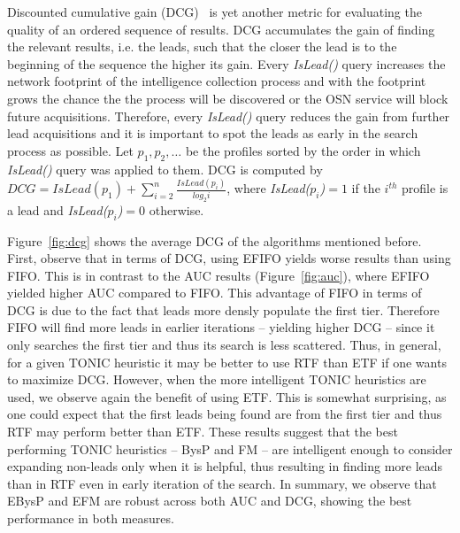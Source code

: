 \documentclass[prodmode,acmtecs]{acmsmall} %
\newcommand{\islead}[1]{{\em IsLead(#1)}}
\begin{document}
 

Discounted cumulative gain (DCG)~\cite{dcg} is yet another metric for evaluating the quality of an ordered  sequence of results.
DCG accumulates the gain of finding the relevant results, i.e. the leads, such that the closer the lead is to the beginning of the sequence the higher its gain. 
Every \islead{} query increases the network footprint of the intelligence collection process and with the footprint grows the chance the the process will be discovered or the OSN service will block future acquisitions. 
Therefore, every \islead{} query reduces the gain from further lead acquisitions and it is important to spot the leads as early in the search process as possible.
Let \(p_1,p_2,\ldots\) be the profiles sorted by the order in which \islead{} query was applied to them. 
DCG is computed by $DCG=IsLead(p_1)+\sum_{i=2}^n \frac{IsLead(p_i)}{log_2 i}$, where \islead{\(p_i\)}\(=1\) if the $i^{th}$ profile is a lead and \islead{\(p_i\)}\(=0\) otherwise. 

Figure~\ref{fig:dcg} shows the average DCG of the algorithms mentioned before. First, observe that in terms of DCG, using EFIFO yields worse results than using FIFO. This is in contrast to the AUC results (Figure~\ref{fig:auc}), where EFIFO yielded higher AUC compared to FIFO. 
This advantage of FIFO in terms of DCG is due to the fact that leads more densly populate the first tier. Therefore FIFO will find more leads in earlier iterations -- yielding higher DCG -- since it only searches the first tier and thus its search is less scattered. Thus, in general, for a given TONIC heuristic it may be better to use RTF than ETF if one wants to maximize DCG. 
However, when the more intelligent TONIC heuristics are used, we observe again the benefit of using ETF. This is somewhat surprising, as one could expect that the first leads being found are from the first tier and thus RTF may perform better than ETF. These results suggest that the best performing TONIC heuristics -- BysP and FM -- are intelligent enough to consider expanding non-leads only when it is helpful, thus resulting in finding more leads than in RTF even in early iteration of the search. 
In summary, we observe that EBysP and EFM are robust across both AUC and DCG, showing the best performance in both measures. 

\end{document}

